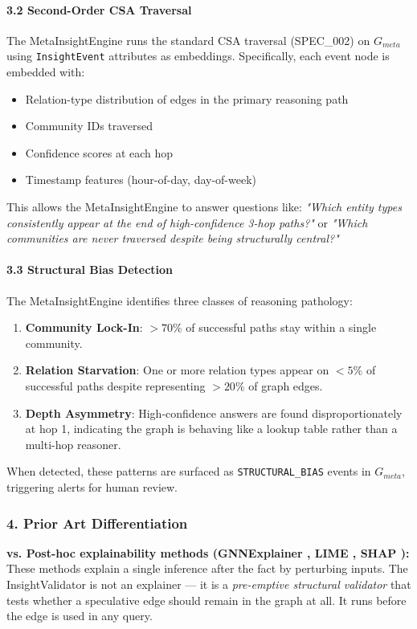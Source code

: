 \paragraph{3.2 Second-Order CSA Traversal}
The MetaInsightEngine runs the standard CSA traversal (SPEC\_002) on $G_{meta}$ using \texttt{InsightEvent} attributes as embeddings. Specif\-ically, each event node is embedded with:
\begin{itemize}
\item Relation-type distr\-ibution of edges in the primary reasoning path
\item Community IDs traversed
\item Confidence scores at each hop
\item Timestamp features (hour-of-day, day-of-week)

\end{itemize}
This allows the MetaInsightEngine to answer questions like: \textit{"Which entity types consi\-stently appear at the end of high-confidence 3-hop paths?"} or \textit{"Which communities are never traversed despite being struc\-turally central?"}

\paragraph{3.3 Structural Bias Detection}
The MetaInsightEngine identifies three classes of reasoning pathology:
\begin{enumerate}
\item \textbf{Community Lock-In}: $> 70\%$ of successful paths stay within a single community.
\item \textbf{Relation Starvation}: One or more relation types appear on $< 5\%$ of successful paths despite repre\-senting $> 20\%$ of graph edges.
\item \textbf{Depth Asymmetry}: High-confidence answers are found dispr\-oportionately at hop 1, indicating the graph is behaving like a lookup table rather than a multi-hop reasoner.

\end{enumerate}
When detected, these patterns are surfaced as \texttt{STRUCTURAL\_BIAS} events in $G_{meta}$, triggering alerts for human review.

\subsubsection{4. Prior Art Differ\-entiation}

\textbf{vs. Post-hoc expla\-inability methods (GNNExplainer \cite{ying2019gnnexplainer}, LIME \cite{ribeiro2016lime}, SHAP \cite{lundberg2017shap}):} These methods explain a single inference after the fact by perturbing inputs. The InsightValidator is not an explainer — it is a \textit{pre-emptive structural validator} that tests whether a speculative edge should remain in the graph at all. It runs before the edge is used in any query.

